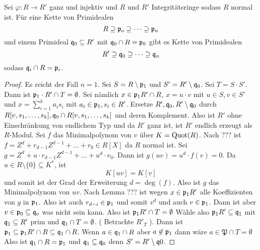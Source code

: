 \begin{Satz}\label{Satz:GoingDown} 
	Sei \( \varphi \colon R \to R' \) ganz und injektiv und \( R \) und \( R' \) Integritätsringe sodass \( R \) normal ist.
	Für eine Kette von Primidealen \[ R \supseteq \mathfrak{p}_o \supseteq \dots \supseteq \mathfrak{p}_n \] und einem Primideal
	\( \mathfrak{q}_0 \subseteq R' \) mit \( \mathfrak{q}_0 \cap R = \mathfrak{p}_0 \) gibt es Kette von Primidealen
	\[ R' \supseteq \mathfrak{q}_0 \supseteq \dots \supseteq \mathfrak{q}_n \] sodass \( \mathfrak{q}_i \cap R = \mathfrak{p}_i \).
\end{Satz}
\begin{proof}
	Es reicht der Fall \( n = 1 \).
	Sei \( S = R \setminus \mathfrak{p}_1 \) und \( S' = R' \setminus \mathfrak{q}_0 \). Sei \( T= S\cdot S' \). Dann ist \( \mathfrak{p}_1 \cdot R' \cap T = \emptyset \).
	Sei nämlich \( x \in \mathfrak{p}_1R' \cap R \), \( x = u\cdot v \) mit \( u \in S , v \in S'\) und 
	\( x = \sum_{i=1}^ka_is_i \) mit \( a_i \in \mathfrak{p}_1, s_i \in R' \).
	Ersetze \( R' , \mathfrak{q}_0 , R'\setminus \mathfrak{q}_0 \) durch \( R[ v , s_1, \dots , s_k ] , \mathfrak{q}_0 \cap R[ v , s_1, \dots , s_k ] \) und deren Komplement.
	Also ist \( R'\) ohne Einschränkung von endlichem Typ und da \( R' \) ganz ist, ist \( R' \) endlich erzeugt als \( R \)-Modul.
	Sei \( f \) das Minimalpolynom von \( v \) über \( K = \operatorname{Quot} ( R ) \).
	Nach ??? ist \( f = Z^d+r_{d-1}Z^{d-1}+\dots+r_0\in R[X] \) da \( R \) normal ist.
	Sei \( g = Z^d+u \cdot r_{d-1}Z^{d-1}+\dots+u ^ d \cdot r_0\).
	Dann ist \( g ( u v ) = u ^ d \cdot f ( v ) = 0 \). Da \( u \in R\setminus \{ 0 \}\subseteq K^* \), ist
	\[ K[uv] = K [ v ] \] und somit ist der Grad der Erweiterung \( d = \deg ( f ) \).
	Also ist \( g \) das Minimalpolynom von \( uv \).
	Nach Lemma ??? ist wegen \( x \in \mathfrak{p}_1R' \) alle Koeffizienten von \( g \) in \( \mathfrak{p}_1 \). Also ist auch 
	\( r_{d-i} \in \mathfrak{p}_1 \) und somit \( v ^ d \) und auch \( v \in \mathfrak{p}_1 \).
	Dann ist aber \( v \in \mathfrak{p}_0 \subseteq \mathfrak{q}_o \) was nicht sein kann. Also ist \( \mathfrak{p}_1R' \cap T = \emptyset \)
	Wähle also \( \mathfrak{p}_1R' \subseteq \mathfrak{q}_1 \) mit \( \mathfrak{q}_1 \subseteq R' \) prim und \( \mathfrak{q}_1\cap T = \emptyset \).
	( Betrachte \( R'_T\) ).
	Dann ist \( \mathfrak{p}_1 \subseteq \mathfrak{p}_1 R' \cap R \subseteq \mathfrak{q}_1 \cap R \).
	Wenn \( a \in \mathfrak{q}_1 \cap R \) aber \( a \not \in \mathfrak{p}_1 \) dann wäre \( a \in \mathfrak{P} \cap T =\emptyset\)
	Also ist \( \mathfrak{q}_1 \cap R = \mathfrak{p}_1\) und \(\mathfrak{q}_1\subseteq\mathfrak{q}_0\) denn \( S' = R' \setminus \mathfrak{q}0 \).
\end{proof}







